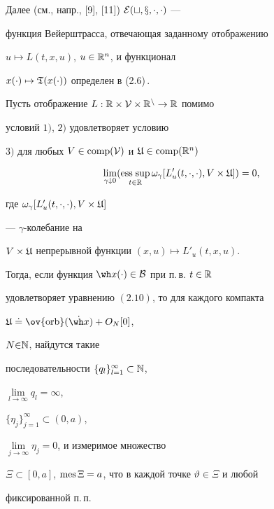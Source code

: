 Далее (см., напр., [9], [11]) $\cal E(t,x,\cdot,\cdot)$ ---


функция Вейерштрасса, отвечающая заданному отображению


$u\mapsto L(t,x,u)$, $u\in\Bbb R^n$, и функционал


$x(\cdot)\mapsto{\frak T}(x(\cdot))$ определен в (2.6)\,.





\begin{lems}


Пусть отображение $L:\Bbb R\times\cal V\times\Bbb R^n\to\Bbb R$ помимо


условий $1)$, $2)$ удовлетворяет условию





$3)$ для любых $V\in\operatorname{comp}(\cal V)$ и $\frak U\in\operatorname{comp}(\Bbb R^n)$


\begin{equation}


\lim_{\gamma\downarrow 0}(\esssup_{t\in\Bbb R}\omega_\gamma


[L'_u(t,\cdot,\cdot),V\times\frak U])=0,


\end{equation}


где $\omega_\gamma[L'_u(t,\cdot,\cdot),V\times\frak U]$


--- $\gamma$-колебание на


$V\times\frak U$ непрерывной функции $(x,u)\mapsto L'_u(t,x,u)$.





Тогда, если функция $\wh x(\cdot)\in\cal B$ при п.\,в. $t\in\Bbb R$


удовлетворяет уравнению $(2.10)$, то для каждого компакта


$\frak U\doteq\ov{\orb}(\Dot{\wh x})+O_N[0]$,


$N{\in}{\Bbb N}$, найдутся такие


последовательности $\{q_l\}_{l=1}^\infty\subset\Bbb N$,


$\lim\limits_{l\to\infty}q_l{=}\infty$,


$\{\eta_j\}_{j=1}^\infty\subset(0,a)$,


$\lim\limits_{j\to\infty}\eta_j=0$, и измеримое множество


$\Xi\subset[0,a]$, $\operatorname{mes}\Xi=a$, что в каждой точке $\vartheta\in\Xi$ и любой


фиксированной п.\,п.



\end{lems}
